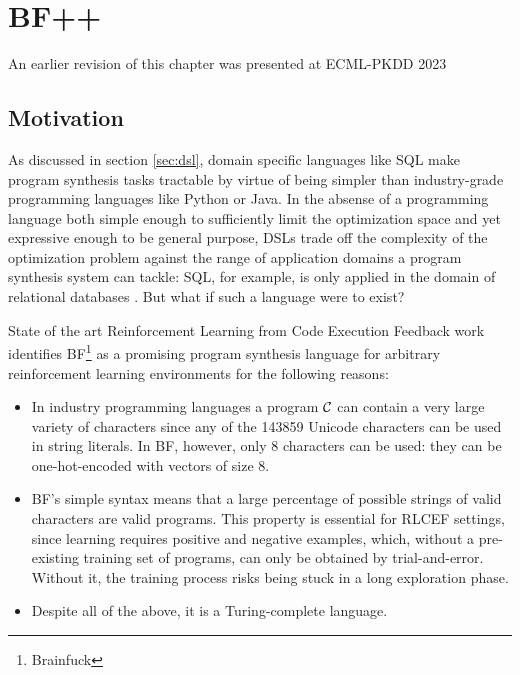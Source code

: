 \chapter{BF++}\label{ch:bfpp}

\begin{remark}
    An earlier revision of this chapter \cite{liventsevBFLanguageGeneralpurpose2022} was presented at ECML-PKDD 2023
\end{remark}

\section{Motivation}

As discussed in section \ref{sec:dsl}, domain specific languages like SQL make program synthesis tasks tractable by virtue of being simpler than industry-grade programming languages like Python or Java.
In the absense of a programming language both simple enough to sufficiently limit the optimization space and yet expressive enough to be general purpose, DSLs trade off the complexity of the optimization problem against the range of application domains a program synthesis system can tackle: SQL, for example, is only applied in the domain of relational databases \cite{atzeniRelationalDatabaseTheory1993}.
But what if such a language were to exist?

State of the art Reinforcement Learning from Code Execution Feedback work \cite{abolafiaNeuralProgramSynthesis2018} identifies BF\footnote{Brainfuck} \cite{mullerBrainfuckEightinstructionTuringcomplete1993} as a promising program synthesis language for arbitrary reinforcement learning environments for the following reasons:
\begin{itemize}
    \item In industry programming languages a program $\mathcal{C}$ can contain a very large variety of characters since any of the 143859 Unicode \cite{allenUnicodeStandard2012} characters can be used in string literals. In BF, however, only 8 characters can be used: they can be one-hot-encoded with vectors of size 8. 
    \item BF's simple syntax means that a large percentage of possible strings of valid characters are valid programs. 
    This property is essential for RLCEF settings, since learning requires positive and negative examples, which, without a pre-existing training set of programs, can only be obtained by trial-and-error.
    Without it, the training process risks being stuck in a long exploration phase.
    \item Despite all of the above, it is a Turing-complete language.
\end{itemize}

